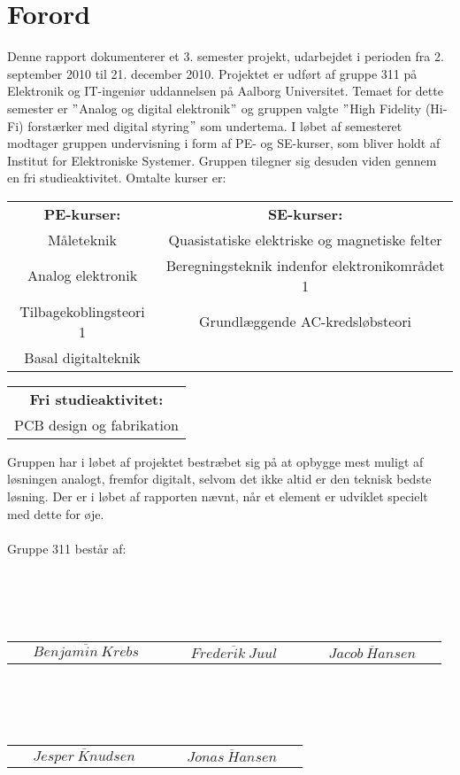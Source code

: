 \chapter*{Forord}
\label{forord}
Denne rapport dokumenterer et 3. semester projekt, udarbejdet i perioden fra 2. september 2010 til 21. december 2010. Projektet er udført af gruppe 311 på Elektronik og IT-ingeniør uddannelsen på Aalborg Universitet. Temaet for dette semester er $"$Analog og digital elektronik$"$ og gruppen valgte $"$High Fidelity (Hi-Fi) forstærker med digital styring$"$ som undertema. I løbet af semesteret modtager gruppen undervisning i form af PE- og SE-kurser, som bliver holdt af Institut for Elektroniske Systemer. Gruppen tilegner sig desuden viden gennem en fri studieaktivitet. Omtalte kurser er:

\begin{table}[h]
\centering
\begin{tabular}{c c}
\textbf{PE-kurser:} & \textbf{SE-kurser:} \\
Måleteknik & Quasistatiske elektriske og magnetiske felter \\
Analog elektronik & Beregningsteknik indenfor elektronikområdet 1 \\
Tilbagekoblingsteori 1 & Grundlæggende AC-kredsløbsteori \\
Basal digitalteknik & \\
\end{tabular}
\label{tab:kurser1}
\end{table}
\begin{table}[h]
\centering
\begin{tabular}{c}
\textbf{Fri studieaktivitet:} \\
PCB design og fabrikation \\
\end{tabular}
\label{tab:kurser2}
\end{table}
Gruppen har i løbet af projektet bestræbet sig på at opbygge mest muligt af løsningen analogt, fremfor digitalt, selvom det ikke altid er den teknisk bedste løsning. Der er i løbet af rapporten nævnt, når et element er udviklet specielt med dette for øje.\\\\
Gruppe 311 består af: \\\\\\\\\\
\begin{table}[h]
\centering
\begin{tabular}{c c c}
$\overline{~~~~~~Benjamin~Krebs~~~~~~}$ & $\overline{~~~~~~Frederik~Juul~~~~~~}$ & $\overline{~~~~~~Jacob~Hansen~~~~~~}$\\
\end{tabular}
\label{tab:gruppemedlemmer1}
\end{table} \\\\\\
\begin{table}[h]
\centering
\begin{tabular}{c c}
$\overline{~~~~~~Jesper~Knudsen~~~~~~}$ & $\overline{~~~~~~Jonas~Hansen~~~~~~}$\\
\end{tabular}
\label{tab:gruppemedlemmer2}
\end{table}